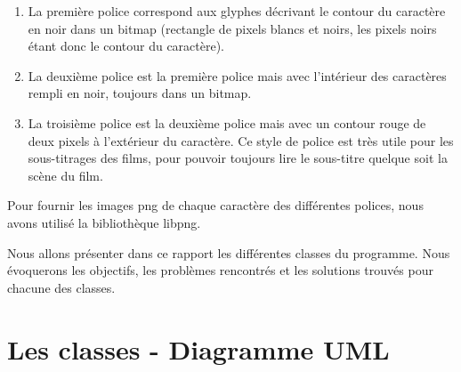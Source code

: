 \documentclass[a4paper, 12pt]{article}
\begin{document}
	\begin{enumerate}
		\item La première police correspond aux glyphes décrivant le contour du caractère en noir dans un bitmap (rectangle de pixels blancs et noirs, les pixels noirs étant donc le contour du caractère). 
		\item La deuxième police est la première police mais avec l’intérieur des caractères rempli en noir, toujours dans un bitmap. 
		\item La troisième police est la deuxième police mais avec un contour rouge de deux pixels à l’extérieur du caractère. Ce style de police est très utile pour les sous-titrages des films, pour pouvoir toujours lire le sous-titre quelque soit la scène du film. 
 	\end{enumerate}

	Pour fournir les images png de chaque caractère des différentes polices, nous avons utilisé la bibliothèque libpng.
\newline

Nous allons présenter dans ce rapport les différentes classes du programme. Nous évoquerons les objectifs, les problèmes rencontrés et les solutions trouvés pour chacune des classes.
	
\newpage

\section{Les classes - Diagramme UML}			
\end{document}

